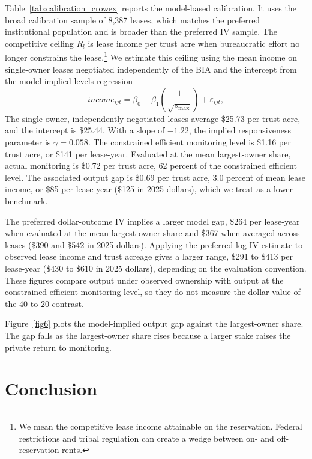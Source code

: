 \documentclass[12pt]{article}
\begin{document}
Table~\ref{tab:calibration_crowex} reports the model-based calibration. It uses the broad calibration sample of 8,387 leases, which matches the preferred institutional population and is broader than the preferred IV sample. The competitive ceiling $R_l$ is lease income per trust acre when bureaucratic effort no longer constrains the lease.\footnote{We mean the competitive lease income attainable on the reservation. Federal restrictions and tribal regulation can create a wedge between on- and off-reservation rents.} We estimate this ceiling using the mean income on single-owner leases negotiated independently of the BIA and the intercept from the model-implied levels regression
\begin{equation} \label{(24)}
    income_{ijt}=\beta_0+\beta_1 \left(\frac{1}{\sqrt{s_{\max}}}\right)+\varepsilon_{ijt},
\end{equation}
\noindent The single-owner, independently negotiated leases average \$25.73 per trust acre, and the intercept is \$25.44. With a slope of $-1.22$, the implied responsiveness parameter is $\gamma=0.058$. The constrained efficient monitoring level is \$1.16 per trust acre, or \$141 per lease-year. Evaluated at the mean largest-owner share, actual monitoring is \$0.72 per trust acre, 62 percent of the constrained efficient level. The associated output gap is \$0.69 per trust acre, 3.0 percent of mean lease income, or \$85 per lease-year (\$125 in 2025 dollars), which we treat as a lower benchmark.

The preferred dollar-outcome IV implies a larger model gap, \$264 per lease-year when evaluated at the mean largest-owner share and \$367 when averaged across leases (\$390 and \$542 in 2025 dollars). Applying the preferred log-IV estimate to observed lease income and trust acreage gives a larger range, \$291 to \$413 per lease-year (\$430 to \$610 in 2025 dollars), depending on the evaluation convention. These figures compare output under observed ownership with output at the constrained efficient monitoring level, so they do not measure the dollar value of the 40-to-20 contrast.

Figure~\ref{fig6} plots the model-implied output gap against the largest-owner share. The gap falls as the largest-owner share rises because a larger stake raises the private return to monitoring.

\section{Conclusion}
\end{document}
